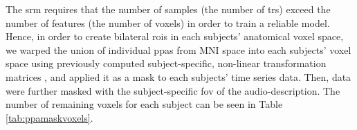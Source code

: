 







The \ac{srm} requires that the number of samples (the number of \acp{tr}) exceed
the number of features (the number of voxels) in order to train a reliable
model.
Hence, in order to create bilateral \acp{roi} in each subjects' anatomical voxel
space, we warped the union of individual \acp{ppa}
\citep[s.][]{haeusler2022processing} from MNI space into each subjects' voxel
space using previously computed subject-specific, non-linear transformation
matrices
\citep[][\href{https://github.com/psychoinformatics-de/studyforrest-data-templatetransforms
}{\url{github.com/psychoinformatics-de/studyforrest-data-templatetransforms}}]{hanke2014audiomovie},
and applied it as a mask to each subjects' time series data.
Then, data were further masked with the subject-specific \ac{fov} of the
audio-description.
%
The number of remaining voxels for each subject can be seen in Table
\ref{tab:ppamaskvoxels}.



